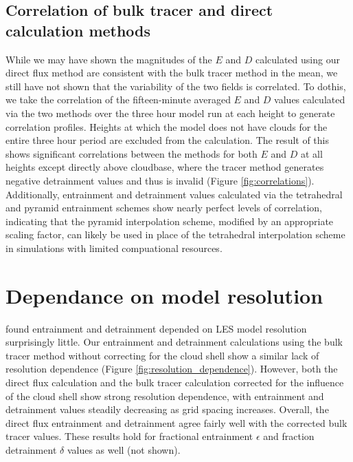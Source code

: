 \documentclass[12pt]{article}
\begin{document}

\subsection{Correlation of bulk tracer and direct calculation methods}

While we may have shown the magnitudes of the $E$ and $D$ calculated using our
direct flux method are consistent with the bulk tracer method in the mean, we
still have not shown that the variability of the two fields is correlated.  To
dothis, we take the correlation of the fifteen-minute averaged $E$ and $D$
values calculated via the two methods over the three hour model run at each
height to generate correlation profiles.  Heights at which the model does not
have clouds for the entire three hour period are excluded from the
calculation.  The result of this shows significant correlations between the
methods for both $E$ and $D$ at all heights except directly above cloudbase,
where the tracer method generates negative detrainment values and thus is
invalid (Figure \ref{fig:correlations}).  Additionally, entrainment and
detrainment values calculated via the tetrahedral and pyramid entrainment
schemes show nearly perfect levels of correlation, indicating that the pyramid
interpolation scheme, modified by an appropriate scaling factor, can likely be
used in place of the tetrahedral interpolation scheme in simulations with
limited compuational resources.


\section{Dependance on model resolution}

\cite{Brown1999} found entrainment and detrainment depended on LES model 
resolution surprisingly little.  Our entrainment and detrainment calculations 
using the bulk tracer method without correcting for the cloud shell show a
similar lack of resolution dependence (Figure \ref{fig:resolution_dependence}).
However, both the direct flux calculation and the bulk tracer calculation 
corrected for the influence of the cloud shell show strong resolution
dependence, with entrainment and detrainment values steadily decreasing as 
grid spacing increases.  Overall, the direct flux entrainment and detrainment 
agree fairly well with the corrected bulk tracer values.  These results hold 
for fractional entrainment $\epsilon$ and fraction detrainment $\delta$ values
as well (not shown).
\end{document}
